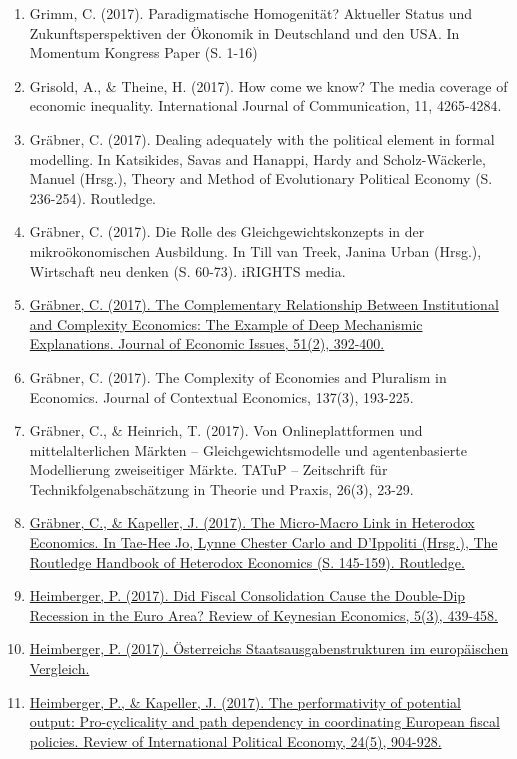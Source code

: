 \begin{enumerate}
	 \item Grimm, C. (2017). Paradigmatische Homogenität? Aktueller Status und Zukunftsperspektiven der Ökonomik in Deutschland und den USA. In Momentum Kongress Paper (S. 1-16)
	 \item Grisold, A., \& Theine, H. (2017). How come we know? The media coverage of economic inequality. International Journal of Communication, 11, 4265-4284.
	 \item Gräbner, C. (2017). Dealing adequately with the political element in formal modelling. In Katsikides, Savas and Hanappi, Hardy and Scholz-Wäckerle, Manuel (Hrsg.), Theory and Method of Evolutionary Political Economy (S. 236-254). Routledge.
	 \item Gräbner, C. (2017). Die Rolle des Gleichgewichtskonzepts in der mikroökonomischen Ausbildung. In Till van Treek, Janina Urban (Hrsg.), Wirtschaft neu denken (S. 60-73). iRIGHTS media.
	 \item \href{https://doi.org/10.1080/00213624.2017.1320915}{Gräbner, C. (2017). The Complementary Relationship Between Institutional and Complexity Economics: The Example of Deep Mechanismic Explanations. Journal of Economic Issues, 51(2), 392-400.}
	 \item Gräbner, C. (2017). The Complexity of Economies and Pluralism in Economics. Journal of Contextual Economics, 137(3), 193-225.
	 \item Gräbner, C., \& Heinrich, T. (2017). Von Onlineplattformen und mittelalterlichen Märkten -- Gleichgewichtsmodelle und agentenbasierte Modellierung zweiseitiger Märkte. TATuP -- Zeitschrift für Technikfolgenabschätzung in Theorie und Praxis, 26(3), 23-29.
	 \item \href{https://doi.org/10.4324/9781315707587.ch10}{Gräbner, C., \& Kapeller, J. (2017). The Micro-Macro Link in Heterodox Economics. In Tae-Hee Jo, Lynne Chester Carlo and D'Ippoliti (Hrsg.), The Routledge Handbook of Heterodox Economics (S. 145-159). Routledge.}
	 \item \href{https://doi.org/10.4337/roke.2017.03.06}{Heimberger, P. (2017). Did Fiscal Consolidation Cause the Double-Dip Recession in the Euro Area? Review of Keynesian Economics, 5(3), 439-458.}
	 \item \href{https://wiiw.ac.at/oesterreichs-staatsausgabenstrukturen-im-europaeischen-vergleich-dlp-4278.pdf}{Heimberger, P. (2017). Österreichs Staatsausgabenstrukturen im europäischen Vergleich.}
	 \item \href{https://doi.org/10.1080/09692290.2017.1363797}{Heimberger, P., \& Kapeller, J. (2017). The performativity of potential output: Pro-cyclicality and path dependency in coordinating European fiscal policies. Review of International Political Economy, 24(5), 904-928.}

\end{enumerate}
